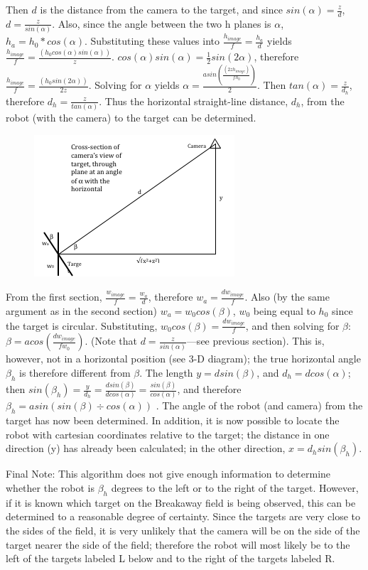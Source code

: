 \documentclass{article}
\begin{document}
Then $d$ is the distance from the camera to the target, and since $sin(\alpha) = \frac{z}{d}$, $d = \frac{z}{sin(\alpha)}$. Also, since the angle between the two h planes is $\alpha$, $h_a = h_0 * cos(\alpha)$. Substituting these values into $\frac{h_{image}}{f} = \frac{h_a}{d}$ yields $\frac{h_{image}}{f} = \frac{(h_0 cos(\alpha) sin(\alpha))}{z}$. $cos(\alpha)sin(\alpha) = \frac{1}{2} sin(2 \alpha)$, therefore $\frac{h_{image}}{f} = \frac{(h_0 sin(2 \alpha))}{2z}$. Solving for $\alpha$ yields $\alpha = \frac{asin (\frac{(2zh_{image})}{fh_0})}{2}$. Then $tan(\alpha) = \frac{z}{d_h}$, therefore  $d_h = \frac{z}{tan(\alpha)}$. Thus the horizontal straight-line distance, $d_h$,  from the robot (with the camera) to the target can be determined.

\begin{figure}[!htbp]

		\centering

		\includegraphics{xy_target_model.png}

\end{figure}

From the first section, $\frac{w_{image}}{f} = \frac{w_{a}}{d}$, therefore $ w_a = \frac{dw_{image}}{f}$. Also (by the same argument as in the second section) $w_a = w_0 cos(\beta)$, $w_0$ being equal to $h_0$ since the target is circular. Substituting, $w_0 cos(\beta) = \frac{dw_{image}}{f}$, and then solving for $\beta$: $\beta = acos (\frac{dw_{image}}{fw_0})$. (Note that $d = \frac{z}{sin(\alpha)}$—see previous section). This is, however, not in a horizontal position (see 3-D diagram); the true horizontal angle $\beta_h$ is therefore different from $\beta$. The length $y = d sin(\beta)$, and $d_h = d cos(\alpha)$; then $sin(\beta_h) = \frac{y}{d_h} = \frac{d sin(\beta)}{d cos(\alpha)} = \frac{sin(\beta)}{cos(\alpha)}$, and therefore $\beta_h = asin (sin(\beta) ÷ cos(\alpha))$ . The angle of the robot (and camera) from the target has now been determined. In addition, it is now possible to locate the robot with cartesian coordinates relative to the target; the distance in one direction (y) has already been calculated; in the other direction, $x = d_h sin(\beta_h)$.

Final Note: This algorithm does not give enough information to determine whether the robot is $\beta_h$ degrees to the left or to the right of the target. However, if it is known which target on the Breakaway field is being observed, this can be determined to a reasonable degree of certainty. Since the targets are very close to the sides of the field, it is very unlikely that the camera will be on the side of the target nearer the side of the field; therefore the robot will most likely be to the left of the targets labeled L below and to the right of the targets labeled R.
\end{document}
